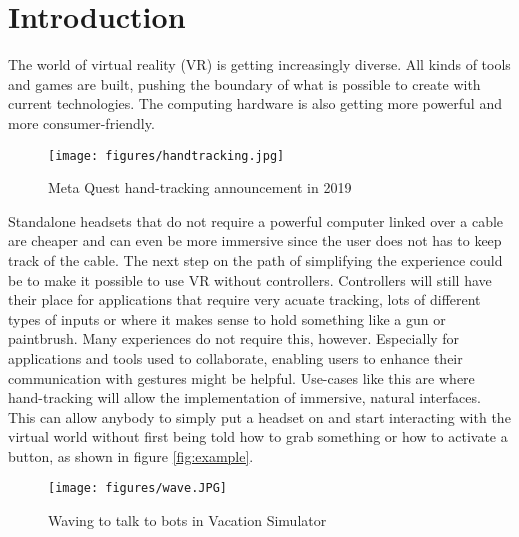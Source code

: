 
\chapter{Introduction}
The world of virtual reality (VR) is getting increasingly diverse. All kinds of tools and games are built, pushing the boundary of what is possible to create with current technologies. The computing hardware is also getting more powerful and more consumer-friendly.

\begin{figure}[!h]
    \centering
    \texttt{[image: figures/handtracking.jpg]}
    \caption{Meta Quest hand-tracking announcement in 2019 \cite{annoucment}}
    \label{fig:quest}
\end{figure}

Standalone headsets that do not require a powerful computer linked over a cable are cheaper and can even be more immersive since the user does not has to keep track of the cable. The next step on the path of simplifying the experience could be to make it possible to use VR without controllers. Controllers will still have their place for applications that require very acuate tracking, lots of different types of inputs or where it makes sense to hold something like a gun or paintbrush. Many experiences do not require this, however. 
Especially for applications and tools used to collaborate, enabling users to enhance their communication with gestures might be helpful. Use-cases like this are where hand-tracking will allow the implementation of immersive, natural interfaces. This can allow anybody to simply put a headset on and start interacting with the virtual world without first being told how to grab something or how to activate a button, as shown in figure \ref{fig:example}.


\begin{figure}[!h]
    \centering
    \texttt{[image: figures/wave.JPG]}
    \caption{Waving to talk to bots in Vacation Simulator}
    \label{fig:waving}
\end{figure}



